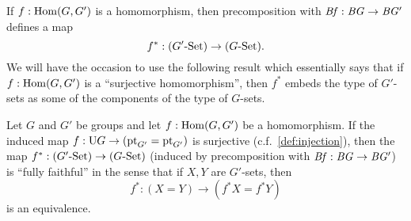 If $f:\Hom(G,G')$ is a homomorphism, then precomposition with $\mathit{B}\mathit{f}:\mathit{B}\mathit{G}\to \mathit{B}\mathit{G}'$ defines a map $$f^*:(G'\text{-}\mathrm{Set})\to(G\text{-}\mathrm{Set}).$$
We will have the occasion to use the following result which essentially says that if $f:\Hom(G,G')$ is a ``surjective homomorphism'', then $f^*$ embeds the type of $G'$-sets as some of the components of the type of $G$-sets.
\begin{lemma}
  \label{lem:epifullyfaithful}
  Let $G$ and $G'$ be groups and let $f:\Hom(G,G')$ be a homomorphism.  If the induced map $f:\mathrm{U} G\to(\mathrm{pt}_{G'}=\mathrm{pt}_{G'})$ is surjective (c.f.~\cref{def:injection}), then the map $f^*:(G'\text{-}\mathrm{Set})\to(G\text{-}\mathrm{Set})$ (induced by precomposition with $\mathit{B}\mathit{f}:\mathit{B}\mathit{G}\to \mathit{B}\mathit{G}'$) is ``fully faithful'' in the sense that if $X,Y$ are $G'$-sets, then
$$f^*:(X=Y)\to(f^*X=f^*Y)
$$
is an equivalence.
\end{lemma}
